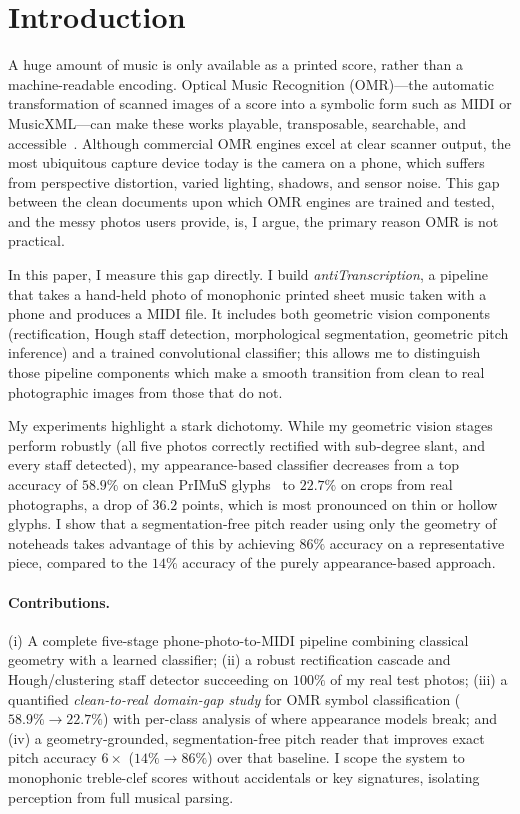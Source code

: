 \section{Introduction}
\label{sec:intro}

A huge amount of music is only available as a printed score, rather than a
machine-readable encoding. Optical Music Recognition (OMR)---the automatic
transformation of scanned images of a score into a symbolic form such as MIDI or
MusicXML---can make these works playable, transposable, searchable, and
accessible~\cite{calvo2020understanding}. Although commercial OMR engines excel
at clear scanner output, the most ubiquitous capture device today is the camera
on a phone, which suffers from perspective distortion, varied lighting, shadows,
and sensor noise. This gap between the clean documents upon which OMR engines are
trained and tested, and the messy photos users provide, is, I argue, the primary
reason OMR is not practical.

In this paper, I measure this gap directly. I build \emph{antiTranscription}, a
pipeline that takes a hand-held photo of monophonic printed sheet music taken
with a phone and produces a MIDI file. It includes both geometric vision
components (rectification, Hough staff detection, morphological segmentation,
geometric pitch inference) and a trained convolutional classifier; this allows
me to distinguish those pipeline components which make a smooth transition from
clean to real photographic images from those that do not.

My experiments highlight a stark dichotomy. While my geometric vision stages
perform robustly (all five photos correctly rectified with sub-degree slant, and
every staff detected), my appearance-based classifier decreases from a top
accuracy of $58.9\%$ on clean PrIMuS glyphs~\cite{calvo2018primus} to $22.7\%$ on
crops from real photographs, a drop of $36.2$ points, which is most pronounced on
thin or hollow glyphs. I show that a segmentation-free pitch reader using only
the geometry of noteheads takes advantage of this by achieving $86\%$ accuracy on
a representative piece, compared to the $14\%$ accuracy of the purely
appearance-based approach.

\paragraph{Contributions.}
(i) A complete five-stage phone-photo-to-MIDI pipeline combining classical
geometry with a learned classifier; (ii) a robust rectification cascade and
Hough/clustering staff detector succeeding on $100\%$ of my real test photos;
(iii) a quantified \emph{clean-to-real domain-gap study} for OMR symbol
classification ($58.9\%\!\rightarrow\!22.7\%$) with per-class analysis of where
appearance models break; and (iv) a geometry-grounded, segmentation-free pitch
reader that improves exact pitch accuracy $6\times$ ($14\%\!\rightarrow\!86\%$)
over that baseline. I scope the system to monophonic treble-clef scores without
accidentals or key signatures, isolating perception from full musical parsing.
